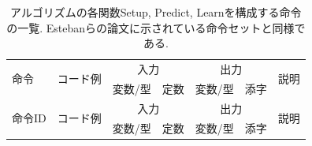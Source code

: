 \documentclass[11pt,oneside,openany,report]{jsbook}
\begin{document}
\begin{center}
  {\renewcommand\arraystretch{1.9}
    {\scriptsize
      \begin{longtable}{l|l|lc|lc|l}
        \caption{アルゴリズムの各関数Setup, Predict, Learnを構成する命令の一覧. Estebanらの論文\cite{automl_zero}に示されている命令セットと同様である. }
        \\
        \hline
        \multirow{2}{*}{命令}
             & \multirow{2}{*}{コード例}
             & \multicolumn{2}{c|}{入力}                    & \multicolumn{2}{c|}{出力}
             & \multirow{2}{*}{説明}                                                                                                                                                                          \\
             &                                            & 変数/型                    & 定数              & 変数/型       & 添字                                                                                     \\
        \hline \hline
        \endfirsthead
        \hline
        \multirow{2}{*}{命令ID}
             & \multirow{2}{*}{コード例}
             & \multicolumn{2}{c|}{入力}                    & \multicolumn{2}{c|}{出力}
             & \multirow{2}{*}{説明}                                                                                                                                                                          \\
             &                                            & 変数/型                    & 定数              & 変数/型       & 添字                                                                                     \\
        \hline \hline
        \endhead


\end{longtable}}}
\end{center}
\end{document}
